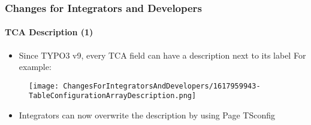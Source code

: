 %

\begin{frame}[fragile]
	\frametitle{Changes for Integrators and Developers}
	\framesubtitle{TCA Description (1)}

	\begin{itemize}
		\item Since TYPO3 v9, every TCA field can have a description next to
			its label\newline
			For example:
	\end{itemize}
	\begin{figure}
		\texttt{[image: ChangesForIntegratorsAndDevelopers/1617959943-TableConfigurationArrayDescription.png]}
	\end{figure}
	\vspace{-0.4cm}
	\begin{itemize}
		\item Integrators can now overwrite the description by using Page TSconfig
	\end{itemize}
\end{frame}


